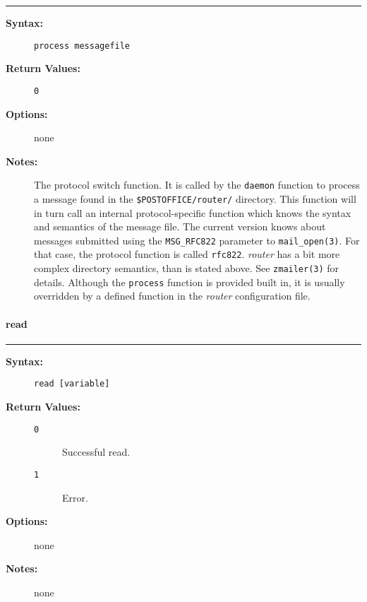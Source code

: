 \hrule
\begin{description}
\item[{\bf Syntax:}] \mbox{}

{\tt process messagefile}

\item[{\bf Return Values:}] \mbox{}

\begin{description}
\item[{\tt 0}] \mbox{}



\end{description}


\item[{\bf Options:}] \mbox{}

none  

\item[{\bf Notes:}] \mbox{}

The protocol switch function. It is called by
the {\tt daemon} function to process a message found in the 
{\tt \$POSTOFFICE/router/} directory. This function will 
in turn call an internal protocol-specific function which knows the 
syntax and semantics of the message file. The current version knows 
about messages submitted using the {\tt MSG\_RFC822} parameter to 
{\tt mail\_open(3)}. For that case, the protocol function is called 
{\tt rfc822}. {\em router\/} has a bit more complex directory 
semantics, than is stated above. See {\tt zmailer(3)} for details. 
Although the {\tt process} function is provided built in, it is 
usually overridden by a defined function in the {\em router\/} 
configuration file.

\end{description}


\vspace {2pt}


\paragraph{read}

\hrule
\begin{description}
\item[{\bf Syntax:}] \mbox{}

{\tt read [variable]}

\item[{\bf Return Values:}] \mbox{}

\begin{description}
\item[{\tt 0}] \mbox{}

Successful read.

\item[{\tt 1}] \mbox{}

Error.

\end{description}


\item[{\bf Options:}] \mbox{}

none  

\item[{\bf Notes:}] \mbox{}

none  

\end{description}


